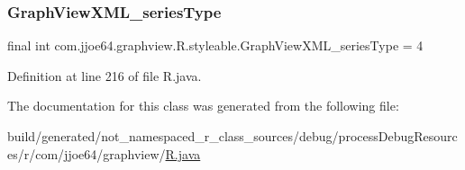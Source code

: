 \subsubsection{\texorpdfstring{GraphViewXML\_seriesType}{GraphViewXML\_seriesType}}
{\footnotesize\ttfamily final int com.\+jjoe64.\+graphview.\+R.\+styleable.\+Graph\+View\+X\+M\+L\+\_\+series\+Type = 4\hspace{0.3cm}{\ttfamily [static]}}



Definition at line 216 of file R.\+java.



The documentation for this class was generated from the following file\+:\begin{DoxyCompactItemize}
\item 
build/generated/not\+\_\+namespaced\+\_\+r\+\_\+class\+\_\+sources/debug/process\+Debug\+Resources/r/com/jjoe64/graphview/\mbox{\hyperlink{com_2jjoe64_2graphview_2_r_8java}{R.\+java}}\end{DoxyCompactItemize}
